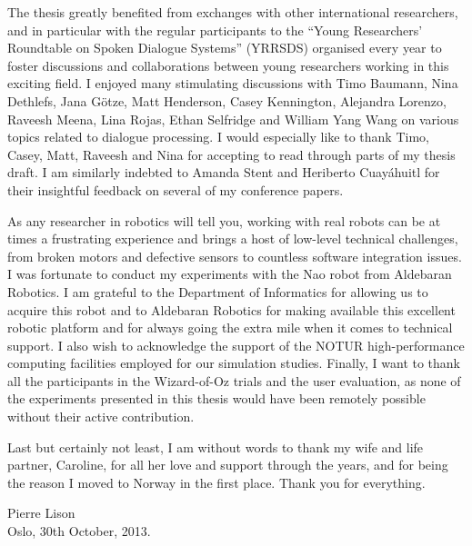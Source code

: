 The thesis greatly benefited from exchanges with other international researchers, and in particular with the regular participants to the ``Young Researchers' Roundtable on Spoken Dialogue Systems'' (YRRSDS) organised every year to foster discussions and collaborations between young researchers working in this exciting field. I enjoyed many stimulating discussions with Timo Baumann, Nina Dethlefs, Jana G\"otze,  Matt Henderson, Casey Kennington, Alejandra Lorenzo, Raveesh Meena, Lina Rojas, Ethan Selfridge and William Yang Wang on various topics related to dialogue processing.  I would especially like to thank Timo, Casey, Matt, Raveesh and Nina for accepting to read through parts of my thesis draft. I am similarly indebted to Amanda Stent and Heriberto Cuay\'{a}huitl for their insightful feedback on several of my conference papers.

As any researcher in robotics will tell you, working with real robots can be at times a frustrating experience and brings a host of low-level technical challenges, from broken motors and defective sensors to countless software integration issues. I was fortunate to conduct my experiments with the Nao robot from Aldebaran Robotics.  I am grateful to the Department of Informatics for allowing us to acquire this robot and to Aldebaran Robotics for making available this excellent robotic platform and for always going the extra mile when it comes to technical support. I also wish to acknowledge the support of the NOTUR high-performance computing facilities employed for our simulation studies. Finally, I want to thank all the participants in the Wizard-of-Oz trials and the user evaluation, as none of the experiments presented in this thesis would have been remotely possible without their active contribution.

Last but certainly not least, I am without words to thank my wife and life partner, Caroline, for all her love and support through the years, and for being the reason I moved to Norway in the first place. Thank you for everything.

\vspace{1cm}

\begin{flushright}Pierre Lison \\ Oslo, 30th October, 2013. \end{flushright}

